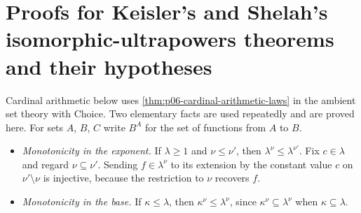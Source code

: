 \section{Proofs for Keisler's and Shelah's isomorphic-ultrapowers theorems and their hypotheses}
\label{sec:p03-w03-p03-018-annex}

Cardinal arithmetic below uses \cref{thm:p06-cardinal-arithmetic-laws} in the
ambient set theory with Choice.  Two elementary facts are used repeatedly and
are proved here.  For sets \(A\), \(B\), \(C\) write \(B^A\) for the set of
functions from \(A\) to \(B\).
\begin{itemize}
  \item \emph{Monotonicity in the exponent.}  If \(\lambda\ge1\) and
        \(\nu\le\nu'\), then \(\lambda^\nu\le\lambda^{\nu'}\).  Fix
        \(c\in\lambda\) and regard \(\nu\subseteq\nu'\).  Sending
        \(f\in\lambda^\nu\) to its extension by the constant value \(c\) on
        \(\nu'\setminus\nu\) is injective, because the restriction to \(\nu\)
        recovers \(f\).
  \item \emph{Monotonicity in the base.}  If \(\kappa\le\lambda\), then
        \(\kappa^\nu\le\lambda^\nu\), since \(\kappa^\nu\subseteq\lambda^\nu\)
        when \(\kappa\subseteq\lambda\).
\end{itemize}

